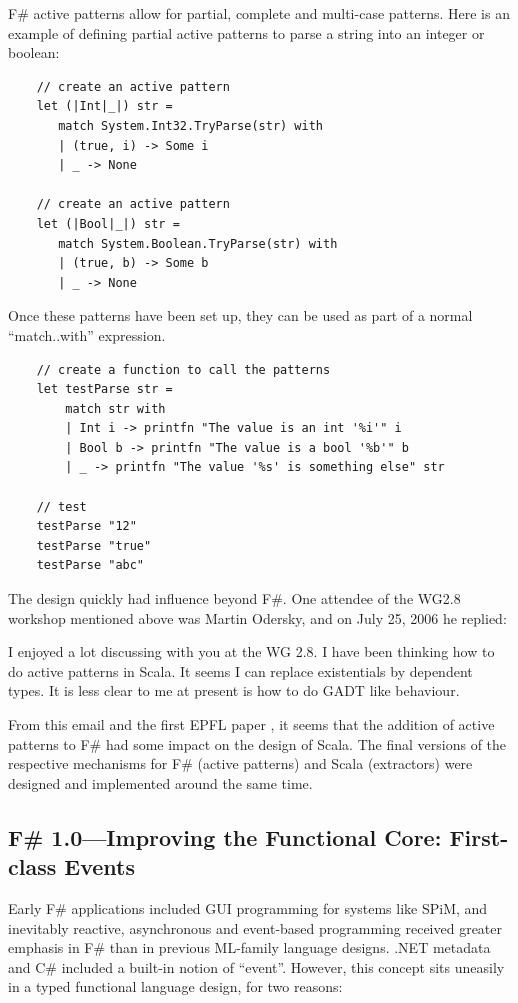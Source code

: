 \documentclass[acmsmall]{acmart}\settopmatter{}
\begin{document}
F\# active patterns allow for partial, complete and multi-case patterns. Here is an example of defining partial active patterns to parse a string into an integer or boolean:

\begin{verbatim}
    // create an active pattern
    let (|Int|_|) str =
       match System.Int32.TryParse(str) with
       | (true, i) -> Some i
       | _ -> None

    // create an active pattern
    let (|Bool|_|) str =
       match System.Boolean.TryParse(str) with
       | (true, b) -> Some b
       | _ -> None
\end{verbatim}
Once these patterns have been set up, they can be used as part of a normal “match..with” expression.

\begin{verbatim}
    // create a function to call the patterns
    let testParse str = 
        match str with
        | Int i -> printfn "The value is an int '%i'" i
        | Bool b -> printfn "The value is a bool '%b'" b
        | _ -> printfn "The value '%s' is something else" str

    // test
    testParse "12"
    testParse "true"
    testParse "abc"
\end{verbatim}

The design quickly had influence beyond F\#. One attendee of the WG2.8 workshop mentioned above was Martin Odersky, and on July 25, 2006 he replied:

\begin{verbquote}
I enjoyed a lot discussing with you at the WG 2.8. I have been thinking how to do active patterns in Scala. It seems I can replace existentials by dependent types. It is less clear to me at present is how to do GADT like behaviour. 
\end{verbquote}


From this email and the first EPFL paper \citep{Emir2007}, it seems that the addition of active patterns to F\# had some impact on the design of Scala. The final versions of the respective mechanisms for F\# (active patterns) and Scala (extractors) were designed and implemented around the same time.    


\subsection*{F\# 1.0---Improving the Functional Core: First-class Events}

Early F\# applications included GUI programming for systems like SPiM, and inevitably reactive, asynchronous and event-based programming received greater emphasis in F\# than in previous ML-family language designs. .NET metadata and C\# included a built-in notion of “event”. However, this concept sits uneasily in a typed functional language design, for two reasons:
\end{document}
